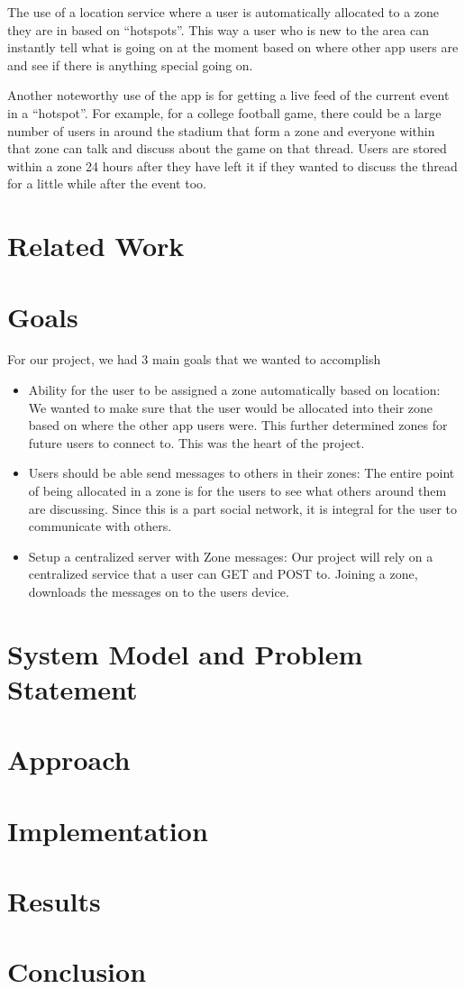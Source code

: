 \documentclass[11pt, journal]{IEEEtran}
\begin{document}
		The use of a location service where a user is automatically allocated to a zone they are in based on ``hotspots''. This way a user who is new to the area can instantly tell what is going on at the moment based on where other app users are and see if there is anything special going on.

		Another noteworthy use of the app is for getting a live feed of the current event in a ``hotspot''. For example, for a college football game, there could be a large number of users in around the stadium that form a zone and everyone within that zone can talk and discuss about the game on that thread. Users are stored within a zone 24 hours after they have left it if they wanted to discuss the thread for a little while after the event too.

\section{Related Work}


\section{Goals}
	For our project, we had 3 main goals that we wanted to accomplish
	\begin{itemize}
		\item Ability for the user to be assigned a zone automatically based on location: We wanted to make sure that the user would be allocated into their zone based on where the other app users were. This further determined zones for future users to connect to. This was the heart of the project.
		\item Users should be able send messages to others in their zones: The entire point of being allocated in a zone is for the users to see what others around them are discussing. Since this is a part social network, it is integral for the user to communicate with others.
		\item Setup a centralized server with Zone messages: Our project will rely on a centralized service that a user can GET and POST to. Joining a zone, downloads the messages on to the users device.
	\end{itemize}

\section{System Model and Problem Statement}


\section{Approach}


\section{Implementation}


\section{Results}


\section{Conclusion}

\end{document}
